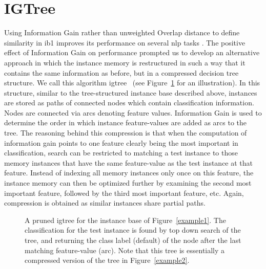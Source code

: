 \documentclass{report}
\begin{document}
\section{IGTree}
\label{igtree}

Using Information Gain rather than unweighted Overlap distance to
define similarity in {\sc ib1} improves its performance on several
{\sc nlp} tasks \cite{Daelemans+92b,VandenBosch+93,VandenBosch97}.
The positive effect of Information Gain on performance prompted us to
develop an alternative approach in which the instance memory is
restructured in such a way that it contains the same information as
before, but in a compressed decision tree structure. We call this
algorithm {\sc igtree}~\cite{Daelemans+97} (see Figure~\ref{example3}
for an illustration). In this structure, similar to the
tree-structured instance base described above, instances are stored as
paths of connected nodes which contain classification
information. Nodes are connected via arcs denoting feature
values. Information Gain is used to determine the order in which
instance feature-values are added as arcs to the tree. The reasoning
behind this compression is that when the computation of information
gain points to one feature clearly being the most important in
classification, search can be restricted to matching a test instance
to those memory instances that have the same feature-value as the test
instance at that feature. Instead of indexing all memory instances
only once on this feature, the instance memory can then be optimized
further by examining the second most important feature, followed by
the third most important feature, etc.  Again, compression is obtained
as similar instances share partial paths.

\begin{figure}[htb]
        \begin{center}
                \leavevmode
                \columnwidth
                \caption{A pruned {\sc igtree} for the instance base
                of Figure~\ref{example1}. The classification for
                the test instance is found by top down search of the
                tree, and returning the class label (default) of the
                node after the last matching feature-value (arc). Note
                that this tree is essentially a compressed version of
                the tree in Figure~\ref{example2}.
                }
                \label{example3}
        \end{center}
\end{figure}
\end{document}
